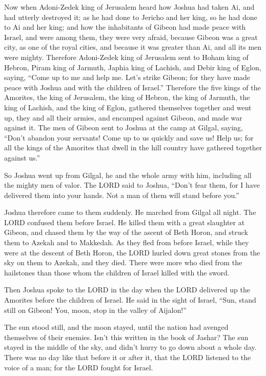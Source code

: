 \mychapter{} \myverse*{}Now when Adoni-Zedek king of Jerusalem heard how Joshua had taken
Ai, and had utterly destroyed it; as he had done to Jericho and her king, so he had done to Ai and her
king; and how the inhabitants of Gibeon had made peace with Israel, and were among them,
\myverse{}they were very afraid, because Gibeon was a great city, as one of the royal
cities, and because it was greater than Ai, and all its men were mighty.
\myverse{}Therefore Adoni-Zedek king of Jerusalem sent to Hoham king of Hebron, Piram
king of Jarmuth, Japhia king of Lachish, and Debir king of Eglon, saying,
\myverse{}“Come up to me and help me. Let’s strike Gibeon; for they have made peace with
Joshua and with the children of Israel.”
\myverse{}Therefore the five kings of the Amorites, the king of Jerusalem, the king of
Hebron, the king of Jarmuth, the king of Lachish, and the king of Eglon, gathered themselves together
and went up, they and all their armies, and encamped against Gibeon, and made war against it.
\myverse{}The men of Gibeon sent to Joshua at the camp at Gilgal, saying, “Don’t abandon
your servants! Come up to us quickly and save us! Help us; for all the kings of the Amorites that dwell
in the hill country have gathered together against us.”

\myverse{}So Joshua went up from Gilgal, he and the whole army with him,
including all the mighty men of valor.
\myverse{}The LORD said to Joshua, “Don’t fear them, for I have delivered them into your
hands. Not a man of them will stand before you.”

\myverse{}Joshua therefore came to them suddenly. He marched from Gilgal
all night.
\myverse{}The LORD confused them before Israel. He killed them with a great slaughter
at Gibeon, and chased them by the way of the ascent of Beth Horon, and struck them to Azekah and to Makkedah.
\myverse{}As they fled from before Israel, while they were at the descent of Beth Horon,
the LORD hurled down great stones from the sky on them to Azekah, and they died. There were more who died
from the hailstones than those whom the children of Israel killed with the sword.

\myverse{}Then Joshua spoke to the LORD in the day when the LORD delivered
up the Amorites before the children of Israel. He said in the sight of Israel, “Sun, stand still on Gibeon!
You, moon, stop in the valley of Aijalon!”

\myverse{}The sun stood still, and the moon stayed, until the nation had
avenged themselves of their enemies. Isn’t this written in the book of Jashar? The sun stayed in the middle
of the sky, and didn’t hurry to go down about a whole day.
\myverse{}There was no day like that before it or after it, that the LORD listened
to the voice of a man; for the LORD fought for Israel.

